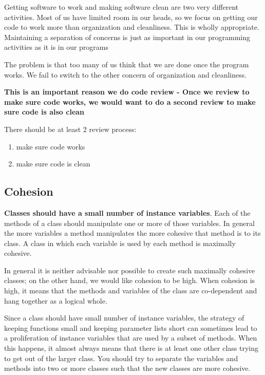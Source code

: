 Getting software to work and making software clean are two very different activities. Most of us have limited room in our heads, so we focus on getting our code to work more than organization and cleanliness. This is wholly appropriate. Maintaining a separation of concerns is just as important in our programming activities as it is in our programs

The problem is that too many of us think that we are done once the program works. We fail to switch to the other concern of organization and cleanliness.

\textbf{This is an important reason we do code review - Once we review to make sure code works, we would want to do a second review to make sure code is also clean}

\begin{marker}
There should be at least 2 review process:

\begin{enumerate}
    \item make sure code works
    \item make sure code is clean
\end{enumerate}
\end{marker}

\subsection{Cohesion}

\textbf{Classes should have a small number of instance variables}. Each of the methods of a class should manipulate one or more of those variables. In general the more variables a method manipulates the more cohesive that method is to its class. A class in which each variable is used by each method is maximally cohesive.

In general it is neither advisable nor possible to create such maximally cohesive classes; on the other hand, we would like cohesion to be high. When cohesion is high, it means that the methods and variables of the class are co-dependent and hang together as a logical whole.

Since a class should have small number of instance variables, the strategy of keeping functions small and keeping parameter lists short can sometimes lead to a proliferation of instance variables that are used by a subset of methods. When this happens, it almost always means that there is at least one other class trying to get out of the larger class. You should try to separate the variables and methods into two or more classes such that the new classes are more cohesive.

